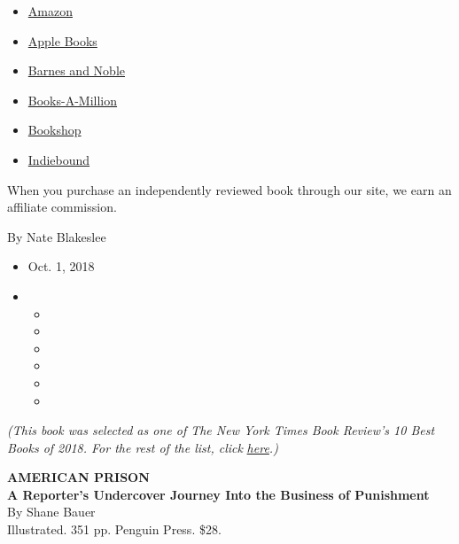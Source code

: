 \begin{itemize}
\tightlist
\item
  \href{https://www.amazon.com/gp/search?index=books\&tag=NYTBSREV-20\&field-keywords=American+Prison\%3A+A+Reporter\%E2\%80\%99s+Undercover+Journey+Into+the+Business+of+Punishment+Shane+Bauer}{Amazon}
\item
  \href{https://du-gae-books-dot-nyt-du-prd.appspot.com/buy?title=American+Prison\%3A+A+Reporter\%E2\%80\%99s+Undercover+Journey+Into+the+Business+of+Punishment\&author=Shane+Bauer}{Apple
  Books}
\item
  \href{https://www.anrdoezrs.net/click-7990613-11819508?url=https\%3A\%2F\%2Fwww.barnesandnoble.com\%2Fw\%2F\%3Fean\%3D9780735223585}{Barnes
  and Noble}
\item
  \href{https://www.anrdoezrs.net/click-7990613-35140?url=https\%3A\%2F\%2Fwww.booksamillion.com\%2Fp\%2FAmerican\%2BPrison\%253A\%2BA\%2BReporter\%25E2\%2580\%2599s\%2BUndercover\%2BJourney\%2BInto\%2Bthe\%2BBusiness\%2Bof\%2BPunishment\%2FShane\%2BBauer\%2F9780735223585}{Books-A-Million}
\item
  \href{https://bookshop.org/a/3546/9780735223585}{Bookshop}
\item
  \href{https://www.indiebound.org/book/9780735223585?aff=NYT}{Indiebound}
\end{itemize}

When you purchase an independently reviewed book through our site, we
earn an affiliate commission.

By Nate Blakeslee

\begin{itemize}
\item
  Oct. 1, 2018
\item
  \begin{itemize}
  \item
  \item
  \item
  \item
  \item
  \item
  \end{itemize}
\end{itemize}

\emph{(This book was selected as one of The New York Times Book Review's
10 Best Books of 2018. For the rest of the list, click}
\href{https://www.nytimes3xbfgragh.onion/2018/11/29/books/review/best-books.html}{\emph{here}}\emph{.)}

\textbf{AMERICAN PRISON}\\
\textbf{A Reporter's Undercover Journey Into the Business of
Punishment}\\
By Shane Bauer\\
Illustrated. 351 pp. Penguin Press. \$28.

